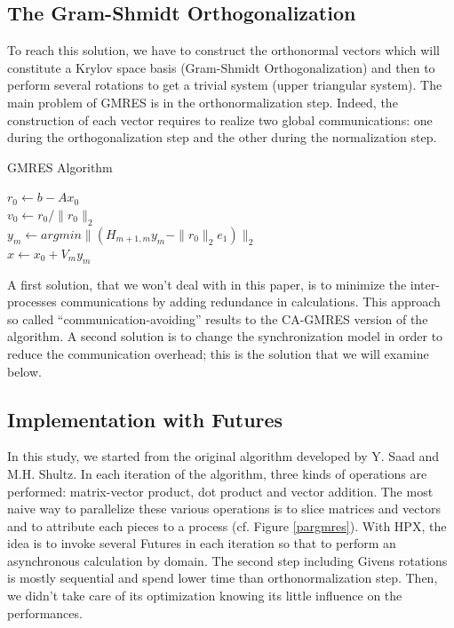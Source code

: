 \documentclass{llncs}
\begin{document}
\subsection{The Gram-Shmidt Orthogonalization}
To reach this solution, we have to construct the orthonormal vectors which will constitute a Krylov space basis (Gram-Shmidt Orthogonalization) and then to perform several rotations to get a trivial system (upper triangular system). The main problem of GMRES is in the orthonormalization step. Indeed, the construction of each vector requires to realize two global communications: one during the orthogonalization step and the other during the normalization step.

\begin{algorithm}
\caption{GMRES Algorithm}
$r_0 \gets b-Ax_0$\\  
$v_0 \gets r_0/\|r_0\|_2$\\ 
  $y_m \gets argmin\|(H_{m+1,m}y_m - \|r_0\|_2e_1)\|_2$\\
  $x \gets x_0 + V_my_m$
\end{algorithm}

A first solution, that we won't deal with in this paper, is to minimize the inter-processes communications by adding redundance in calculations. This approach so called \enquote{communication-avoiding} \cite{CAGMRES} results to the CA-GMRES version of the algorithm. A second solution is to change the synchronization model in order to reduce the communication overhead; this is the solution that we will examine below.

\subsection{Implementation with Futures}
In this study, we started from the original algorithm \cite{GMRES} developed by Y. Saad and M.H. Shultz. In each iteration of the algorithm, three kinds of operations are performed: matrix-vector product, dot product and vector addition. The most naive way to parallelize these various operations is to slice matrices and vectors and to attribute each pieces to a process (cf. Figure \ref{pargmres}). With HPX, the idea is to invoke several Futures in each iteration so that to perform an asynchronous calculation by domain. The second step including Givens rotations is mostly sequential and spend lower time than orthonormalization step. Then, we didn't take care of its optimization knowing its little influence on the performances.
\end{document}
